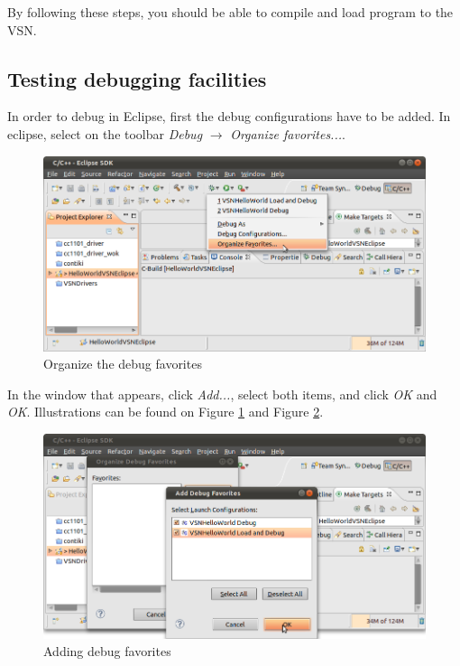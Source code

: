 \documentclass[a4paper, 10pt]{article}
\begin{document}

By following these steps, you should be able to compile and load program to the VSN.

\subsection{Testing debugging facilities}

In order to debug in Eclipse, first the debug configurations have to be added.
In eclipse, select on the toolbar \emph{Debug} $\rightarrow$ \emph{Organize favorites...}.

    \begin{figure}[H]
    \centering
        \includegraphics[width=\textwidth]{./png-install-guide/debug-organize-fav.png}
        \caption{Organize the debug favorites}
        \label{fig:debug-org-fav}
    \end{figure}


In the window that appears, click \emph{Add...},
select both items, and click \emph{OK} and \emph{OK}. Illustrations can be found on
Figure \ref{fig:debug-org-fav} and Figure \ref{fig:debug-add-fav}.

    \begin{figure}[H]
    \centering
        \includegraphics[width=\textwidth]{./png-install-guide/debug-add-fav.png}
        \caption{Adding debug favorites}
        \label{fig:debug-add-fav}
    \end{figure}
\end{document}
